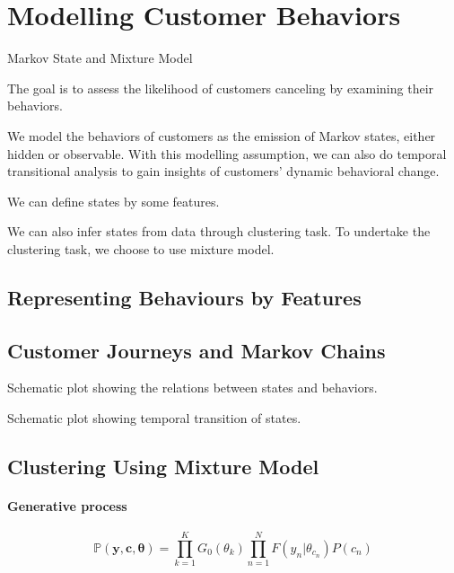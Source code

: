 \section{Modelling Customer Behaviors}
\label{sec:model}

Markov State and Mixture Model

The goal is to assess the likelihood of customers canceling by examining their behaviors.

We model the behaviors of customers as the emission of Markov states, either hidden or observable. With this modelling assumption, we can also do temporal transitional analysis to gain insights of customers' dynamic behavioral change.

We can define states by some features.

We can also infer states from data through clustering task. To undertake the clustering task, we choose to use mixture model. 

\subsection{Representing Behaviours by Features}


\subsection{Customer Journeys and Markov Chains}

Schematic plot showing the relations between states and behaviors.

Schematic plot showing temporal transition of states.


\subsection{Clustering Using Mixture Model}

\paragraph{Generative process}

\begin{equation}
\mathbb{P} (\mathbf{y}, \mathbf{c}, \bm \theta) = \prod_{k=1}^K G_0 (\theta_k) \prod_{n=1}^N F(y_n | \theta_{c_n}) P(c_n)
\end{equation}

